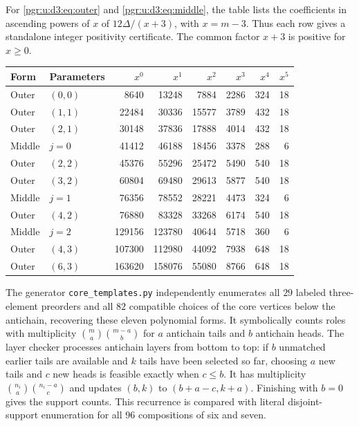 \documentclass[11pt]{article}
\numberwithin{equation}{section}
\theoremstyle{definition}\newtheorem{definition}[theorem]{Definition}\newtheorem{remark}[theorem]{Remark}
\begin{document}
For \eqref{pgr:u:d3:eq:outer} and \eqref{pgr:u:d3:eq:middle}, the table lists the coefficients in ascending powers of $x$ of $12\Delta/(x+3)$, with $x=m-3$. Thus each row gives a standalone integer positivity certificate. The common factor $x+3$ is positive for $x\ge0$.

\begin{center}\small
\begin{tabular}{llrrrrrr}
\toprule
Form & Parameters & $x^0$ & $x^1$ & $x^2$ & $x^3$ & $x^4$ & $x^5$\\\midrule
Outer & $(0,0)$ & 8640 & 13248 & 7884 & 2286 & 324 & 18\\
Outer & $(1,1)$ & 22484 & 30336 & 15577 & 3789 & 432 & 18\\
Outer & $(2,1)$ & 30148 & 37836 & 17888 & 4014 & 432 & 18\\
Middle & $j=0$ & 41412 & 46188 & 18456 & 3378 & 288 & 6\\
Outer & $(2,2)$ & 45376 & 55296 & 25472 & 5490 & 540 & 18\\
Outer & $(3,2)$ & 60804 & 69480 & 29613 & 5877 & 540 & 18\\
Middle & $j=1$ & 76356 & 78552 & 28221 & 4473 & 324 & 6\\
Outer & $(4,2)$ & 76880 & 83328 & 33268 & 6174 & 540 & 18\\
Middle & $j=2$ & 129156 & 123780 & 40644 & 5718 & 360 & 6\\
Outer & $(4,3)$ & 107300 & 112980 & 44092 & 7938 & 648 & 18\\
Outer & $(6,3)$ & 163620 & 158076 & 55080 & 8766 & 648 & 18\\\bottomrule
\end{tabular}
\end{center}

The generator \texttt{core\_templates.py} independently enumerates all $29$ labeled three-element preorders and all $82$ compatible choices of the core vertices below the antichain, recovering these eleven polynomial forms. It symbolically counts roles with multiplicity $\binom ma\binom{m-a}b$ for $a$ antichain tails and $b$ antichain heads. The layer checker processes antichain layers from bottom to top: if $b$ unmatched earlier tails are available and $k$ tails have been selected so far, choosing $a$ new tails and $c$ new heads is feasible exactly when $c\le b$. It has multiplicity $\binom{n_i}a\binom{n_i-a}c$ and updates $(b,k)$ to $(b+a-c,k+a)$. Finishing with $b=0$ gives the support counts. This recurrence is compared with literal disjoint-support enumeration for all $96$ compositions of six and seven.
\end{document}

